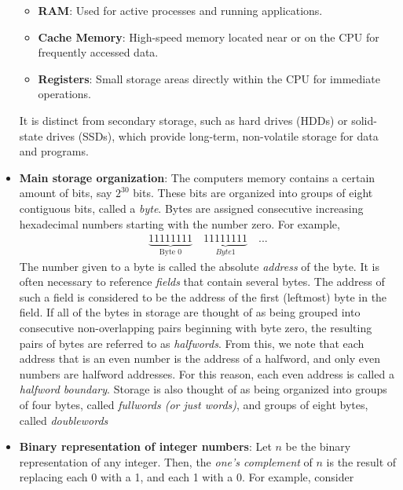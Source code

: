 \documentclass{report}
\begin{document}
\begin{itemize}
            \begin{itemize}
                \item \textbf{RAM}: Used for active processes and running applications.
                \item \textbf{Cache Memory}: High-speed memory located near or on the CPU for frequently accessed data.
                \item \textbf{Registers}: Small storage areas directly within the CPU for immediate operations.
            \end{itemize}
            It is distinct from secondary storage, such as hard drives (HDDs) or solid-state drives (SSDs), which provide long-term, non-volatile storage for data and programs.
        \item \textbf{Main storage organization}: The computers memory contains a certain amount of bits, say $2^{30}$ bits. These bits are organized into groups of eight contiguous bits, called a \textit{byte}. Bytes are assigned consecutive increasing hexadecimal numbers starting with the number zero. For example,
            \begin{align*}
                \underbrace{11111111}_{\text{Byte 0}} \quad \underbrace{11111111}_{Byte 1} \quad ...
            \end{align*}
            The number given to a byte is called the absolute \textit{address} of the byte. It is often necessary to reference \textit{fields} that contain several bytes. The address of such a field is considered to be the address of the first (leftmost) byte in the field.
            \bigbreak \noindent 
            If all of the bytes in storage are thought of as being grouped into consecutive non-overlapping pairs beginning with byte zero, the resulting pairs of bytes are referred to as \textit{halfwords}. From this, we note that each address that is an even number is the address of a halfword, and only even numbers are halfword addresses. For this reason, each even address is called a \textit{halfword boundary}.
            \bigbreak \noindent 
            Storage is also thought of as being organized into groups of four bytes, called \textit{fullwords (or just words)}, and groups of eight bytes, called \textit{doublewords}
        \item \textbf{Binary representation of integer numbers}: Let $n$ be the binary representation of any integer. Then, the \textit{one's complement} of $n$ is the result of replacing each 0 with a 1, and each 1 with a 0.  For example, consider
            \begin{align*}

\end{align*}
\end{itemize}
\end{document}
